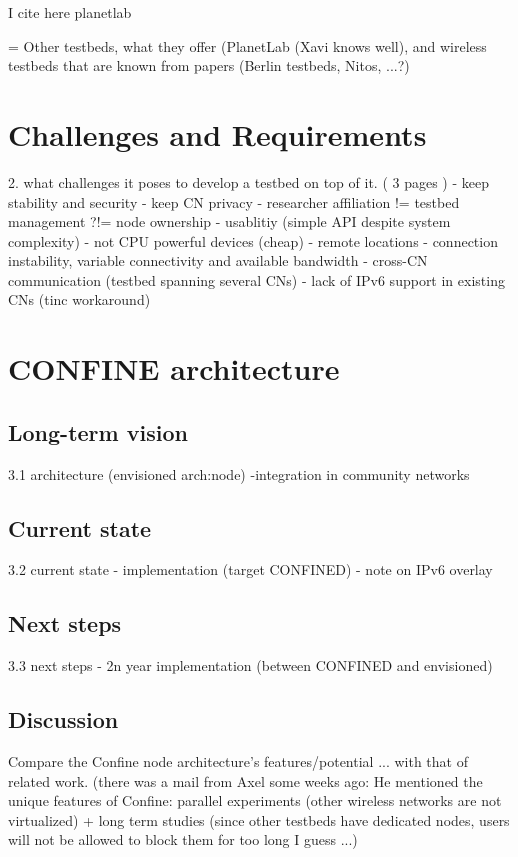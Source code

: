 \documentclass[conference]{IEEEtran}
\begin{document}
I cite here planetlab \cite{planetlab}

= Other testbeds, what they offer (PlanetLab (Xavi knows well), and wireless
testbeds that are known from papers (Berlin testbeds, Nitos, ...?)

\section{Challenges and Requirements}


2. what challenges it poses to develop a testbed on top of it. ( 3 pages )
  - keep stability and security
  - keep CN privacy
  - researcher affiliation != testbed management ?!= node ownership
  - usablitiy (simple API despite system complexity)
  - not CPU powerful devices (cheap)
  - remote locations
  - connection instability, variable connectivity and available bandwidth
  - cross-CN communication (testbed spanning several CNs)
  - lack of IPv6 support in existing CNs (tinc workaround)

\section{CONFINE architecture}

\subsection{Long-term vision}

3.1 architecture (envisioned arch:node)
-integration in community networks
\subsection{Current state}
3.2 current state
- implementation (target CONFINED)
- note on IPv6 overlay
\subsection{Next steps}
3.3 next steps
- 2n year implementation (between CONFINED and envisioned)

\subsection{Discussion}

Compare the Confine node architecture's features/potential ... with that of
related work.
(there was a mail from Axel some weeks ago: He mentioned the unique features of
Confine: parallel experiments (other wireless networks are not virtualized) +
long term studies (since other testbeds have dedicated nodes, users will not be
allowed to block them for too long I guess ...)
\end{document}

